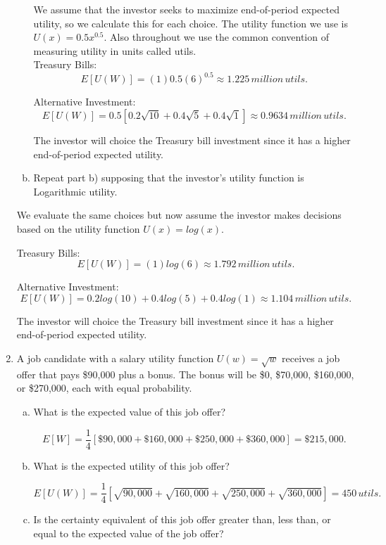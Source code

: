 \documentclass[letterpaper,12pt,fleqn]{article}
\begin{document}
\begin{enumerate}
\begin{enumerate}[a)]
We assume that the investor seeks to maximize end-of-period expected utility, so we calculate this for each choice. The utility function we use is $U(x) = 0.5x^{0.5}$. Also throughout we use the common convention of measuring utility in units called utils.\\

Treasury Bills: 
$$ E[U(W)] = (1)0.5(6)^{0.5} \approx 1.225 \, million \, utils.$$

Alternative Investment:
$$ E[U(W)] = 0.5[0.2\sqrt{10} + 0.4\sqrt{5} + 0.4\sqrt{1}] \approx 0.9634 \, million \, utils.$$

The investor will choice the Treasury bill investment since it has a higher end-of-period expected utility.

\item Repeat part b) supposing that the investor's utility function is Logarithmic utility.
\end{enumerate}

We evaluate the same choices but now assume the investor makes decisions based on the utility function $U(x) = log(x)$.

Treasury Bills: 
$$ E[U(W)] = (1)log(6) \approx 1.792 \, million \, utils.$$

Alternative Investment:
$$ E[U(W)] = 0.2log(10) + 0.4log(5) + 0.4log(1) \approx 1.104 \, million \, utils.$$

The investor will choice the Treasury bill investment since it has a higher end-of-period expected utility.

\vspace{2em}


\item A job candidate with a salary utility function $U(w) = \sqrt{w}$ receives a job offer that pays \$90,000 plus a bonus.  The bonus will be \$0, \$70,000, \$160,000, or \$270,000, each with equal probability.

\begin{enumerate}[a)]
\item What is the expected value of this job offer?

$$E[W] = \frac{1}{4}[\$90,000 + \$160,000 + \$250,000 + \$360,000] = \$215,000.$$

\item What is the expected utility of this job offer?

$$E[U(W)] = \frac{1}{4}[\sqrt{90,000}+\sqrt{160,000} + \sqrt{250,000} + \sqrt{360,000}] = 450 \, utils.$$

\item Is the certainty equivalent of this job offer greater than, less than, or equal to the expected value of the job offer?


\end{enumerate}
\end{enumerate}
\end{document}
